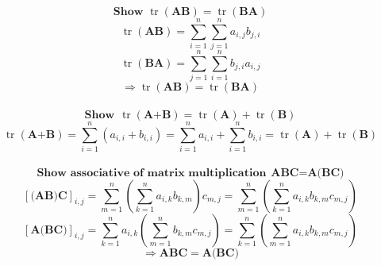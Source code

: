 \documentclass[10pt]{article}
\DeclareMathOperator{\tr}{tr}
\begin{document}
$$\textbf{Show }\tr(\textbf{AB})=\tr(\textbf{BA})$$
$$\tr(\textbf{AB})=\sum_{i=1}^n\sum_{j=1}^na_{i,j}b_{j,i}$$
$$\tr(\textbf{BA})=\sum_{j=1}^n\sum_{i=1}^nb_{j,i}a_{i,j}$$
$$\Rightarrow\tr(\textbf{AB})=\tr(\textbf{BA})$$
\\
$$\textbf{Show }\hspace{1pt}\tr(\textbf{A+B})=\tr(\textbf{A})+\tr(\textbf{B})$$
$$\tr(\textbf{A+B})=\sum_{i=1}^n \left(a_{i,i}+b_{i,i}\right)=\sum_{i=1}^n a_{i,i}+\sum_{i=1}^n b_{i,i}=\tr(\textbf{A})+\tr(\textbf{B})$$
\\
$$\textbf{Show associative of matrix multiplication}\hspace{5pt}\textbf{ABC}=\textbf{A(BC)}$$
$$\left[\textbf{(AB)C}\right]_{i,j}=\sum_{m=1}^n\left(\sum_{k=1}^n a_{i,k}b_{k,m}\right)c_{m,j}=\sum_{m=1}^n\left(\sum_{k=1}^n a_{i,k}b_{k,m} c_{m,j}\right)$$
$$\left[\textbf{A(BC)}\right]_{i,j}=\sum_{k=1}^n a_{i,k}\left(\sum_{m=1}^n b_{k,m} c_{m,j}\right)=\sum_{k=1}^n \left(\sum_{m=1}^n a_{i,k}b_{k,m} c_{m,j}\right)$$
$$\Rightarrow\textbf{ABC}=\textbf{A(BC)}$$
\end{document}

